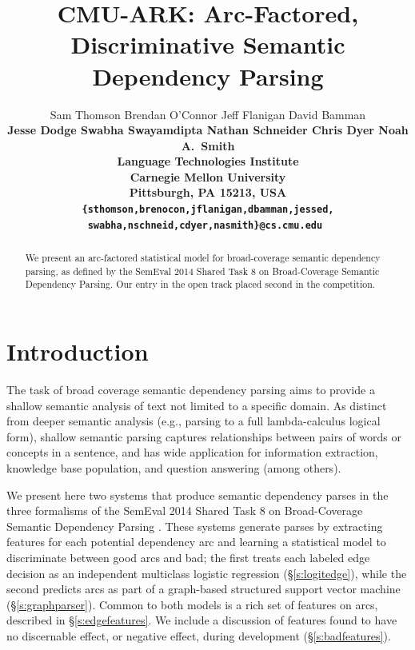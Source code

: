 \documentclass[11pt]{article}
\title{CMU-ARK: Arc-Factored, Discriminative Semantic Dependency Parsing}
\author{
	Sam Thomson \quad
	Brendan O'Connor \quad
	Jeff Flanigan \quad
	David Bamman \quad  \\
	\bf{Jesse Dodge \quad
	Swabha Swayamdipta \quad
	Nathan Schneider \quad
	Chris Dyer \quad
	Noah A.~Smith} \\
  Language Technologies Institute \\
  Carnegie Mellon University \\
  Pittsburgh, PA 15213, USA \\
  {\tt\{sthomson,brenocon,jflanigan,dbamman,jessed,}\\
   \tt{swabha,nschneid,cdyer,nasmith\}@cs.cmu.edu}
}
\date{}
\begin{document}
\maketitle

\begin{abstract}
We present an arc-factored statistical model for broad-coverage
semantic dependency parsing, as defined by the SemEval 2014 Shared
Task 8 on
Broad-Coverage Semantic Dependency Parsing.    Our entry in the open
track placed second in the competition.
\end{abstract}



\section{Introduction}

The task of broad coverage semantic dependency parsing aims to provide a
shallow semantic analysis of text not limited to a specific domain.
As distinct from deeper semantic analysis (e.g., parsing to a full
lambda-calculus logical form), shallow semantic parsing captures relationships
between pairs of words or concepts in a sentence, and has wide application for
information extraction, knowledge base population, and question answering (among others).

We present here two systems that produce semantic dependency parses in the three formalisms of the SemEval 2014 Shared Task 8 on Broad-Coverage Semantic Dependency
Parsing \cite{oepens_broad_2014}.  These systems generate parses by extracting
features for each potential dependency arc and learning a statistical model to
discriminate between good arcs and bad;
the first treats each labeled edge decision as an independent multiclass
logistic regression (\S\ref{s:logitedge}), while the second predicts arcs
as part of a graph-based structured support vector machine (\S\ref{s:graphparser}).
Common to both models is a rich set of features on arcs, described in
\S\ref{s:edgefeatures}.  We include a discussion of features found to
have no discernable effect, or negative effect, during development (\S\ref{s:badfeatures}).
\end{document}
